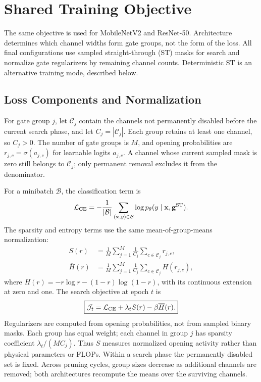 \section{Shared Training Objective}
\label{app:shared-loss}

The same objective is used for MobileNetV2 and ResNet-50. Architecture
determines which channel widths form gate groups, not the form of the
loss. All final configurations use sampled straight-through (ST) masks
for search and normalize gate regularizers by remaining channel counts.
Deterministic ST is an alternative training mode, described below.

\subsection{Loss Components and Normalization}

For gate group $j$, let $\mathcal C_j$ contain the channels not permanently
disabled before the current search phase, and let $C_j=|\mathcal C_j|$.
Each group retains at least one channel, so $C_j>0$. The number of gate
groups is $M$, and opening probabilities are
$r_{j,c}=\sigma(a_{j,c})$ for learnable logits $a_{j,c}$.
A channel whose current sampled mask is zero still belongs to
$\mathcal C_j$; only permanent removal excludes it from the denominator.

For a minibatch $\mathcal B$, the classification term is
\begin{equation}
\mathcal L_{\rm CE}
=-\frac1{|\mathcal B|}\sum_{(\mathbf x,y)\in\mathcal B}
\log p_\theta(y\mid\mathbf x,\mathbf g^{\rm ST}).
\label{eq:shared-classification-loss}
\end{equation}
The sparsity and entropy terms use the same mean-of-group-means
normalization:
\begin{equation}
\begin{aligned}
S(r)&=\frac1M\sum_{j=1}^{M}\frac1{C_j}
\sum_{c\in\mathcal C_j}r_{j,c},\\
\overline H(r)&=\frac1M\sum_{j=1}^{M}\frac1{C_j}
\sum_{c\in\mathcal C_j}H(r_{j,c}),
\end{aligned}
\label{eq:shared-gate-regularizers}
\end{equation}
where $H(r)=-r\log r-(1-r)\log(1-r)$, with its continuous extension at
zero and one. The search objective at epoch $t$ is
\begin{equation}
\boxed{\mathcal J_t=\mathcal L_{\rm CE}+\lambda_t S(r)-\beta\overline H(r).}
\label{eq:shared-search-loss}
\end{equation}
Regularizers are computed from opening probabilities, not from sampled
binary masks. Each group has equal weight; each channel in group $j$
has sparsity coefficient $\lambda_t/(MC_j)$. Thus $S$ measures normalized
opening activity rather than physical parameters or FLOPs.
Within a search phase the permanently disabled set is fixed. Across
pruning cycles, group sizes decrease as additional channels are removed;
both architectures recompute the means over the surviving channels.

